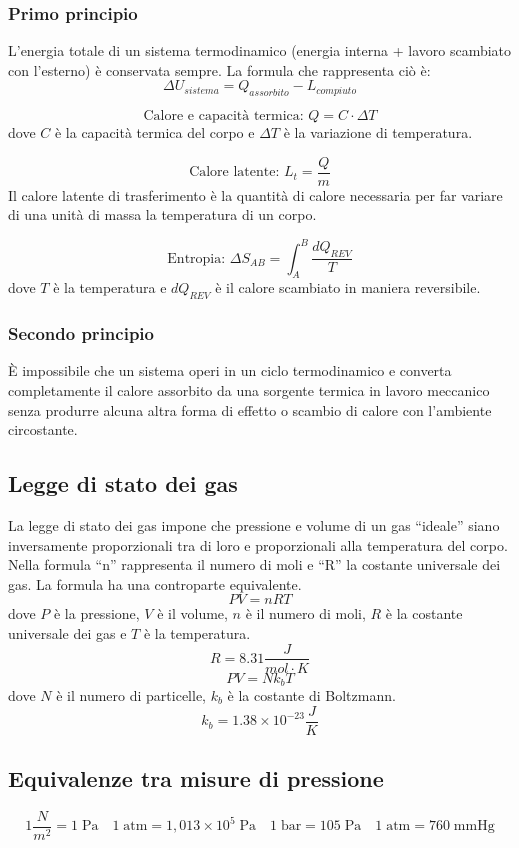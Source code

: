 \documentclass[a4paper]{article}
\theoremstyle{break}
\theoremstyle{break}
\theoremstyle{break}
\theoremstyle{break}
\begin{document}
\subsubsection{Primo principio}
L’energia totale di un sistema termodinamico (energia interna + lavoro scambiato con l’esterno) è
conservata sempre. La formula che rappresenta ciò è:
\[
  \Delta U_{sistema} = Q_{assorbito} - L_{compiuto}
\] 

\[
\text{Calore e capacità termica: } Q = C \cdot \Delta T
\] 
dove \( C \) è la capacità termica del corpo e \( \Delta T \) è la variazione di temperatura.

\[
  \text{Calore latente: } L_{t} = \frac{Q}{m}
\] 
Il calore latente di trasferimento è la quantità di calore necessaria per far
variare di una unità di massa la temperatura di un corpo.

\[
  \text{Entropia: } \Delta S_{AB} = \int_A^B \frac{dQ_{REV}}{T}
\] 
dove \( T \) è la temperatura e \( dQ_{REV} \) è il calore scambiato in maniera reversibile.

\subsubsection{Secondo principio}
È impossibile che un sistema operi in un ciclo termodinamico e converta completamente il calore
assorbito da una sorgente termica in lavoro meccanico senza produrre alcuna altra forma di effetto
o scambio di calore con l'ambiente circostante.

\subsection{Legge di stato dei gas}
La legge di stato dei gas impone che pressione e volume di un gas “ideale” siano inversamente
proporzionali tra di loro e proporzionali alla temperatura del corpo. Nella formula “n” rappresenta il
numero di moli e “R” la costante universale dei gas. La formula ha una controparte equivalente.
\[
  PV = nRT
\]
dove \( P \) è la pressione, \( V \) è il volume, \( n \) è il numero di moli, \( R \) è la costante universale dei gas e \( T \) è la temperatura.
\[
  R = 8.31 \frac{J}{mol \cdot K}
\] 
\[
PV = Nk_bT
\] 
dove \( N \) è il numero di particelle, \( k_b \) è la costante di Boltzmann.
\[
  k_b = 1.38 \times 10^{-23} \frac{J}{K}
\] 

\subsection{Equivalenze tra misure di pressione}
\[
1 \frac{N}{m^2} = 1\; \text{Pa} \quad 1\; \text{atm} = 1,013 \times 10^5\; \text{Pa} \quad
1 \;\text{bar} = 105 \;\text{Pa} \quad 1 \;\text{atm} = 760 \;\text{mmHg}
\] 
\end{document}

